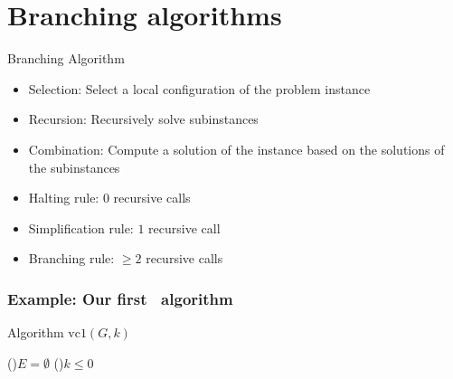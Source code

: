 



\section{Branching algorithms}

\begin{frame}

 \begin{block}{Branching Algorithm}
  \begin{itemize}
   \item \alert{Selection}: Select a local configuration of the problem instance
   \item \alert{Recursion}: Recursively solve subinstances
   \item \alert{Combination}: Compute a solution of the instance based on the solutions of the subinstances
  \end{itemize}
 \end{block}
 
 \begin{itemize}
  \item \alert{Halting} rule: $0$ recursive calls
  \item \alert{Simplification} rule: $1$ recursive call
  \item \alert{Branching} rule: $\ge 2$ recursive calls
 \end{itemize}

\end{frame}

\begin{frame}
 \frametitle{Example: Our first \VC\ algorithm}

\begin{algorithm}[H]
\SetArgSty{}

\alert{Algorithm $\text{vc1}(G,k)$}\;
\BlankLine

   \If(){$E = \emptyset$} {
   }
   \ElseIf(){$k \le 0$} {
   }
\end{algorithm}

\end{frame}

